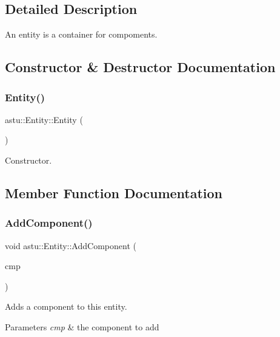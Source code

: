 \subsection{Detailed Description}
An entity is a container for compoments. 

\subsection{Constructor \& Destructor Documentation}
\mbox{\label{classastu_1_1Entity_aed9aac4a995b5c044c0301302f2bd3d0}} 
\subsubsection{\texorpdfstring{Entity()}{Entity()}}
{\footnotesize\ttfamily astu\+::\+Entity\+::\+Entity (\begin{DoxyParamCaption}{ }\end{DoxyParamCaption})\hspace{0.3cm}{\ttfamily [inline]}}

Constructor. 

\subsection{Member Function Documentation}
\mbox{\label{classastu_1_1Entity_ab8f47f4de88139f9202466b726e61aee}} 
\subsubsection{\texorpdfstring{Add\+Component()}{AddComponent()}}
{\footnotesize\ttfamily void astu\+::\+Entity\+::\+Add\+Component (\begin{DoxyParamCaption}\item[{std\+::shared\+\_\+ptr$<$ \hyperlink{classastu_1_1EntityComponent}{Entity\+Component} $>$}]{cmp }\end{DoxyParamCaption})}

Adds a component to this entity.


\begin{DoxyParams}{Parameters}
{\em cmp} & the component to add \\
\hline
\end{DoxyParams}
\mbox{\label{classastu_1_1Entity_adc6d15be60fde34b516546bdc92ff13f}} 
